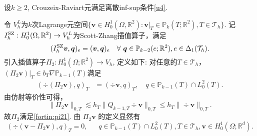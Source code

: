 \begin{lemma}
设$k\geq2$, Crouzeix-Raviart元满足离散inf-sup条件\eqref{u4}.
\end{lemma}
\begin{prf}
令 $V_{h}^L$为$k$次Lagrange元空间$\{\boldsymbol{v}\in H_{0}^{1}(\Omega,\mathbb{R}^{2}): \boldsymbol{v}|_T\in \mathbb P_k(T;\mathbb R^2), T\in \mathcal{T}_h\}$.
记$I_h^{\rm SZ}: H_{0}^{1}(\Omega,\mathbb{R}^{2})\to V_{h}^L$为Scott-Zhang插值算子\cite{ScottZhang1990}，满足
\begin{equation*}
(I_h^{\rm SZ}\boldsymbol{v}, \boldsymbol{q})_e=(\boldsymbol{v}, \boldsymbol{q})_e\quad\forall~\boldsymbol{q}\in\mathbb P_{k-2}(e;\mathbb R^2), e\in\Delta_1(\mathcal T_h).
\end{equation*}
引入插值算子$\Pi_2: H_{0}^{1}(\Omega;\mathbb{R}^{2})\to V_{h}$, 定义如下: 对任意的$T\in\mathcal{T}_h$， $(\Pi_2\boldsymbol{v})|_T\in b_T\nabla\mathbb P_{k-1}(T)$满足
\begin{align*}
(\div(\Pi_2\boldsymbol{v}), q)_T&=(\div\boldsymbol{v}, q)_T, \quad q\in\mathbb P_{k-1}(T)\cap L_0^2(T).
\end{align*}
由仿射等价性可得，
\begin{equation*}
\|\Pi_{2}\boldsymbol{v}\|_{0,T}\lesssim h_T\|Q_{k-1,T}\div\boldsymbol{v}\|_{0,T}\leq h_T\|\div\boldsymbol{v}\|_{0,T}.
\end{equation*}
故$\Pi_2$满足\eqref{fortin:pi21}.
由 $\Pi_{2}\boldsymbol{v}$ 的定义显然有
\begin{equation*}
(\div(\boldsymbol{v}-\Pi_2\boldsymbol{v}),q)_T=0,
\quad\;\; q\in\mathbb P_{k-1}(T)\cap L_0^2(T), T\in\mathcal T_h, \boldsymbol{v}\in H_0^{1}(\Omega; \mathbb{R}^{d}).
\end{equation*}


\end{prf}
